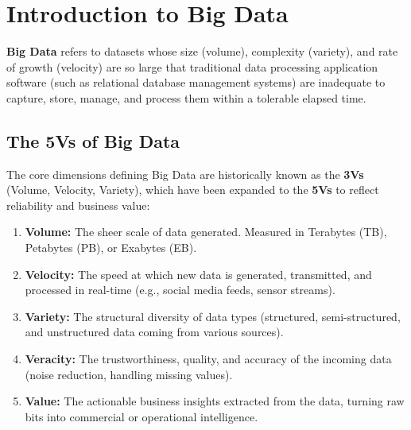\documentclass[12pt,a4paper]{article}
\begin{document}
\section{Introduction to Big Data}

\begin{tcolorbox}[defbox, title={Big Data}]
  \textbf{Big Data} refers to datasets whose size (volume), complexity (variety), and rate of growth (velocity) are so large that traditional data processing application software (such as relational database management systems) are inadequate to capture, store, manage, and process them within a tolerable elapsed time.
\end{tcolorbox}

\subsection{The 5Vs of Big Data}
The core dimensions defining Big Data are historically known as the \textbf{3Vs} (Volume, Velocity, Variety), which have been expanded to the \textbf{5Vs} to reflect reliability and business value:

\begin{enumerate}[leftmargin=*, itemsep=3pt]
  \item \textbf{Volume:} The sheer scale of data generated. Measured in Terabytes (TB), Petabytes (PB), or Exabytes (EB).
  \item \textbf{Velocity:} The speed at which new data is generated, transmitted, and processed in real-time (e.g., social media feeds, sensor streams).
  \item \textbf{Variety:} The structural diversity of data types (structured, semi-structured, and unstructured data coming from various sources).
  \item \textbf{Veracity:} The trustworthiness, quality, and accuracy of the incoming data (noise reduction, handling missing values).
  \item \textbf{Value:} The actionable business insights extracted from the data, turning raw bits into commercial or operational intelligence.
\end{enumerate}
\end{document}
